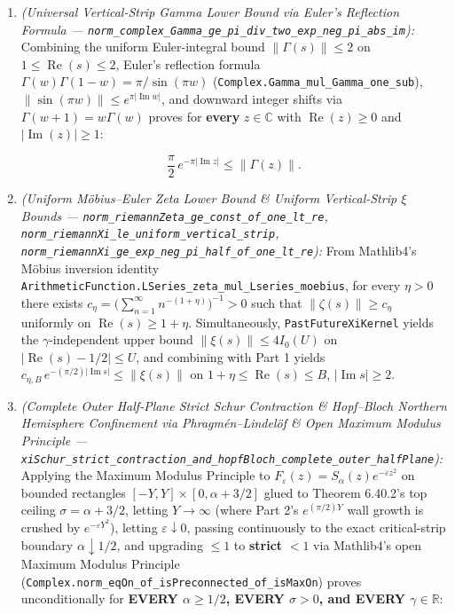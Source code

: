 \documentclass[
  11pt,
]{article}
\begin{document}
\begin{enumerate}
\def\labelenumi{\arabic{enumi}.}
\item
  \emph{(Universal Vertical-Strip Gamma Lower Bound via Euler's
  Reflection Formula ---
  \texttt{norm\_complex\_Gamma\_ge\_pi\_div\_two\_exp\_neg\_pi\_abs\_im}):}
  Combining the uniform Euler-integral bound \(\|\Gamma(s)\| \le 2\) on
  \(1 \le \operatorname{Re}(s) \le 2\), Euler's reflection formula
  \(\Gamma(w)\Gamma(1 - w) = \pi/\sin(\pi w)\)
  (\texttt{Complex.Gamma\_mul\_Gamma\_one\_sub}),
  \(\|\sin(\pi w)\| \le e^{\pi|\operatorname{Im} w|}\), and downward
  integer shifts via \(\Gamma(w + 1) = w\Gamma(w)\) proves for
  \textbf{every} \(z \in \mathbb{C}\) with
  \(\operatorname{Re}(z) \ge 0\) and \(|\operatorname{Im}(z)| \ge 1\):

  \[\frac{\pi}{2}\,e^{-\pi|\operatorname{Im} z|} \le \|\Gamma(z)\|.\]
\item
  \emph{(Uniform Möbius--Euler Zeta Lower Bound \& Uniform
  Vertical-Strip \(\xi\) Bounds ---
  \texttt{norm\_riemannZeta\_ge\_const\_of\_one\_lt\_re},
  \texttt{norm\_riemannXi\_le\_uniform\_vertical\_strip},
  \texttt{norm\_riemannXi\_ge\_exp\_neg\_pi\_half\_of\_one\_lt\_re}):}
  From Mathlib4's Möbius inversion identity
  \texttt{ArithmeticFunction.LSeries\_zeta\_mul\_Lseries\_moebius}, for
  every \(\eta > 0\) there exists
  \(c_\eta = \big(\sum_{n=1}^\infty n^{-(1+\eta)}\big)^{-1} > 0\) such
  that \(\|\zeta(s)\| \ge c_\eta\) uniformly on
  \(\operatorname{Re}(s) \ge 1 + \eta\). Simultaneously,
  \texttt{PastFutureXiKernel} yields the \(\gamma\)-independent upper
  bound \(\|\xi(s)\| \le 4 I_0(U)\) on
  \(|\operatorname{Re}(s) - 1/2| \le U\), and combining with Part 1
  yields
  \(c_{\eta,B}\,e^{-(\pi/2)|\operatorname{Im} s|} \le \|\xi(s)\|\) on
  \(1 + \eta \le \operatorname{Re}(s) \le B\),
  \(|\operatorname{Im} s| \ge 2\).
\item
  \emph{(Complete Outer Half-Plane Strict Schur Contraction \&
  Hopf--Bloch Northern Hemisphere Confinement via Phragmén--Lindelöf \&
  Open Maximum Modulus Principle ---
  \texttt{xiSchur\_strict\_contraction\_and\_hopfBloch\_complete\_outer\_halfPlane}):}
  Applying the Maximum Modulus Principle to
  \(F_\varepsilon(z) = S_\alpha(z) e^{-\varepsilon z^2}\) on bounded
  rectangles \([-Y, Y] \times [0, \alpha + 3/2]\) glued to Theorem
  6.40.2's top ceiling \(\sigma = \alpha + 3/2\), letting
  \(Y \to \infty\) (where Part 2's \(e^{(\pi/2)Y}\) wall growth is
  crushed by \(e^{-\varepsilon Y^2}\)), letting
  \(\varepsilon \downarrow 0\), passing continuously to the exact
  critical-strip boundary \(\alpha \downarrow 1/2\), and upgrading
  \(\le 1\) to \textbf{strict} \(< 1\) via Mathlib4's open Maximum
  Modulus Principle
  (\texttt{Complex.norm\_eqOn\_of\_isPreconnected\_of\_isMaxOn}) proves
  unconditionally for \textbf{EVERY \(\alpha \ge 1/2\), EVERY
  \(\sigma > 0\), and EVERY \(\gamma \in \mathbb{R}\)}:


\end{enumerate}
\end{document}
